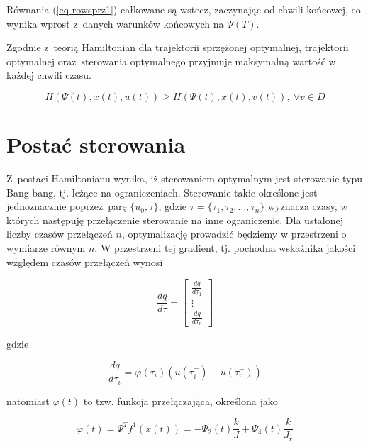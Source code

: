 \documentclass[11pt]{mwart}
\begin{document}
Równania (\ref{eq-rowsprz1}) całkowane są wstecz, zaczynając od chwili końcowej, co wynika wprost z~danych warunków końcowych na $\Psi\left(T\right)$.

Zgodnie z~teorią Hamiltonian dla trajektorii sprzężonej optymalnej, trajektorii optymalnej oraz~sterowania optymalnego przyjmuje maksymalną wartość w każdej chwili czasu.

\begin{equation}
	H\left(\Psi\left(t\right),x\left(t\right),u\left(t\right)\right)\geq H\left(\Psi\left(t\right),x\left(t\right),v\left(t\right)\right),\ \forall v\in D
\end{equation}

\section{Postać sterowania}

Z~postaci Hamiltonianu wynika, iż sterowaniem optymalnym jest sterowanie typu Bang-bang, tj. leżące na ograniczeniach. Sterowanie takie określone jest jednoznacznie poprzez~parę $\{u_{0},\tau\}$, gdzie $\tau=\{\tau_{1},\tau_{2},\dots,\tau_{n}\}$ wyznacza czasy, w których następuję przełączenie sterowanie na inne ograniczenie. 
Dla ustalonej liczby czasów przełączeń $n$, optymalizację prowadzić będziemy w przestrzeni o wymiarze równym $n$. W przestrzeni tej gradient, tj. pochodna wskaźnika jakości względem czasów przełączeń wynosi

\begin{equation}
	\frac{dq}{d\tau}=\left[
	\begin{array}{c}
		\frac{dq}{d\tau_{1}} \\
		\vdots \\
		\frac{dq}{d\tau_{n}}
	\end{array}
	\right]
\end{equation}

gdzie

\begin{equation}
	\frac{dq}{d\tau_{i}} = \varphi\left(\tau_{i}\right)\left(u\left(\tau_{i}^{+}\right)-u\left(\tau_{i}^{-}\right)\right)
\end{equation}

natomiast $\varphi\left(t\right)$ to tzw. funkcja przełączająca, określona jako

\begin{equation}
	\varphi\left(t\right)=\Psi^{T}f^{1}\left(x\left(t\right)\right)=-\Psi_{2}\left(t\right)\frac{k}{J}+\Psi_{4}\left(t\right)\frac{k}{J_{r}}
\end{equation}
\end{document}
